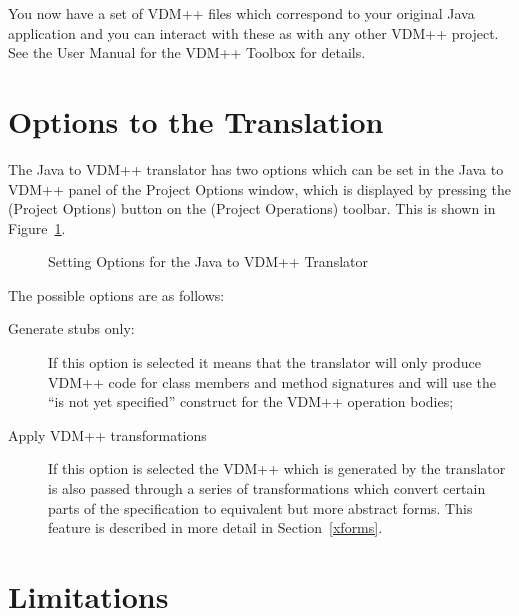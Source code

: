 \documentclass[\pformat,12pt]{article}
\newcommand{\guicmd}[1]{{\sf #1}}
\begin{document}
You now have a set of VDM++ files which correspond to your original
Java application and you can interact with these as with any other
VDM++ project. See the User Manual for the VDM++ Toolbox
\cite{UserManPP-CSK} for details.


\section{Options to the Translation}

The Java to VDM++ translator has two options which can be set in the 
\guicmd{Java to VDM++} panel of the \guicmd{Project Options} window, 
which is displayed by pressing the
(\guicmd{Project Options}) button on the (\guicmd{Project Operations})
toolbar. This is shown in Figure~\ref{fig:j2voptions}.

\begin{figure}[tbh]
\begin{center}
\caption{Setting Options for the Java to VDM++ Translator\label{fig:j2voptions}}
\end{center}
\end{figure}

The possible options are as follows:
\begin{description}
\item[Generate stubs only:]
If this option is selected it means that the translator will only
produce VDM++ code for class members and method signatures and will
use the ``is not yet specified'' construct for the VDM++ operation
bodies; 
\item[Apply VDM++ transformations] If this option is selected the
  VDM++ which is generated by the translator is also passed through a
  series of transformations which convert certain parts of the
  specification to equivalent but more abstract forms. This feature is
  described in more detail in Section~\ref{xforms}. 
\end{description}

\section{Limitations}\label{limitations}
\end{document}
